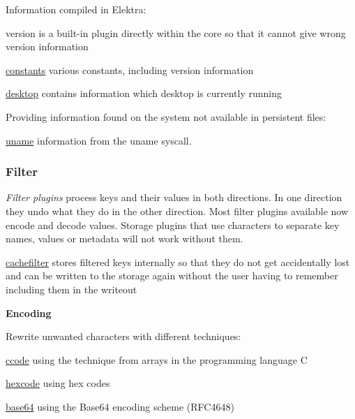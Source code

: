 Information compiled in Elektra\+:
\begin{DoxyItemize}
\item version is a built-\/in plugin directly within the core so that it cannot give wrong version information
\item \hyperlink{md_src_plugins_constants_README_src_plugins_constants_README_md}{constants} various constants, including version information
\item \hyperlink{md_src_plugins_desktop_README_src_plugins_desktop_README_md}{desktop} contains information which desktop is currently running
\end{DoxyItemize}

Providing information found on the system not available in persistent files\+:


\begin{DoxyItemize}
\item \hyperlink{md_src_plugins_uname_README_src_plugins_uname_README_md}{uname} information from the uname syscall.
\end{DoxyItemize}

\subsubsection*{Filter}

{\itshape Filter plugins} process keys and their values in both directions. In one direction they undo what they do in the other direction. Most filter plugins available now encode and decode values. Storage plugins that use characters to separate key names, values or metadata will not work without them.


\begin{DoxyItemize}
\item \hyperlink{md_src_plugins_cachefilter_README_src_plugins_cachefilter_README_md}{cachefilter} stores filtered keys internally so that they do not get accidentally lost and can be written to the storage again without the user having to remember including them in the writeout
\end{DoxyItemize}

{\bfseries Encoding}

Rewrite unwanted characters with different techniques\+:


\begin{DoxyItemize}
\item \hyperlink{md_src_plugins_ccode_README_src_plugins_ccode_README_md}{ccode} using the technique from arrays in the programming language C
\item \hyperlink{md_src_plugins_hexcode_README_src_plugins_hexcode_README_md}{hexcode} using hex codes
\item \hyperlink{md_src_plugins_base64_README_src_plugins_base64_README_md}{base64} using the Base64 encoding scheme (R\+F\+C4648)
\end{DoxyItemize}

